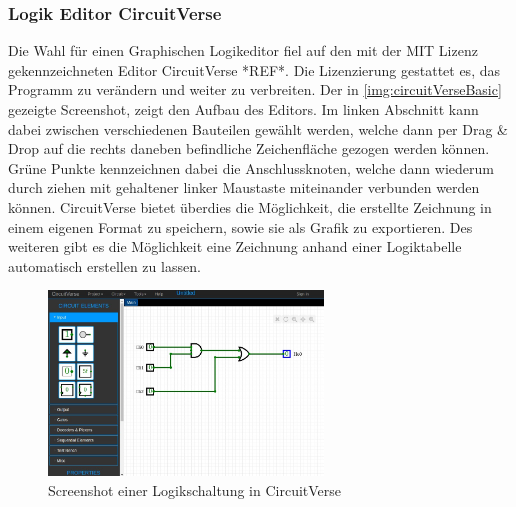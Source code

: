 \subsubsection{Logik Editor CircuitVerse}
Die Wahl für einen Graphischen Logikeditor fiel auf den mit der MIT Lizenz gekennzeichneten Editor CircuitVerse *REF*. Die Lizenzierung gestattet es, das Programm zu verändern und weiter zu verbreiten. Der in \autoref{img:circuitVerseBasic} gezeigte Screenshot, zeigt den Aufbau des Editors. Im linken Abschnitt kann dabei zwischen verschiedenen Bauteilen gewählt werden, welche dann per Drag \& Drop auf die rechts daneben befindliche Zeichenfläche gezogen werden können. Grüne Punkte kennzeichnen dabei die Anschlussknoten, welche dann wiederum durch ziehen mit gehaltener linker Maustaste miteinander verbunden werden können. CircuitVerse bietet überdies die Möglichkeit, die erstellte Zeichnung in einem eigenen Format zu  speichern, sowie sie als Grafik zu exportieren. Des weiteren gibt es die Möglichkeit eine Zeichnung anhand einer Logiktabelle automatisch erstellen zu lassen. 

\begin{figure}[H]
	\begin{center}
		\includegraphics[width=0.65\textwidth ,clip]{./images/circuitverse.jpg}
		\caption{Screenshot einer Logikschaltung in CircuitVerse}
		\label{img:circuitVerseBasic}
	\end{center} 
\end{figure}	

